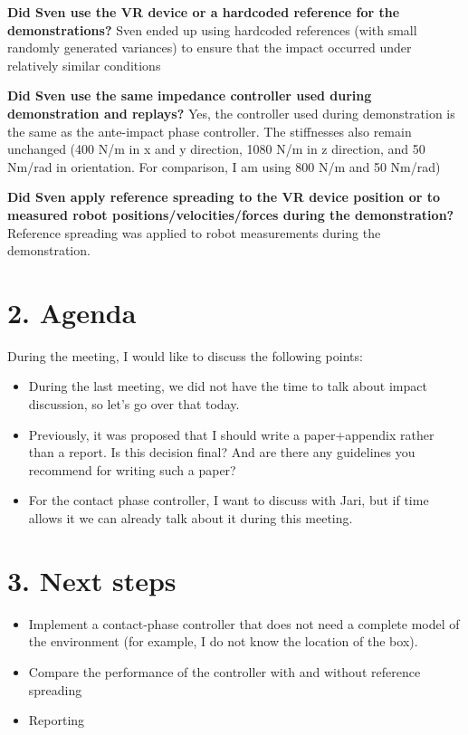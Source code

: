 \documentclass[11pt]{report}
\numberwithin{equation}{section}        %
\numberwithin{figure}{section}          %
\numberwithin{table}{section}           %
\begin{document}
\begin{itemize}
  \textbf{Did Sven use the VR device or a hardcoded reference for the demonstrations?}
  Sven ended up using hardcoded references (with small randomly generated variances) to ensure that the impact occurred under relatively similar conditions

\textbf{Did Sven use the same impedance controller used during demonstration and replays?}
  Yes, the controller used during demonstration is the same as the ante-impact phase controller. The stiffnesses also remain unchanged (400 N/m in x and y direction, 1080 N/m in z direction, and 50 Nm/rad in orientation. For comparison, I am using 800 N/m and 50 Nm/rad) 

\textbf{Did Sven apply reference spreading to the VR device position or to measured robot positions/velocities/forces during the demonstration?}
  Reference spreading was applied to robot measurements during the demonstration. 
\color{black}
  \end{itemize}

  \section*{2. Agenda}
  During the meeting, I would like to discuss the following points:

  \begin{itemize}
      \item During the last meeting, we did not have the time to talk about impact discussion, so let's go over that today.
      \item Previously, it was proposed that I should write a paper+appendix rather than a report. Is this decision final? And are there any guidelines you recommend for writing such a paper?
      \item For the contact phase controller, I want to discuss with Jari, but if time allows it we can already talk about it during this meeting.
  \end{itemize}

  \section*{3. Next steps}

  \begin{itemize}
      \item Implement a contact-phase controller that does not need a complete model of the environment (for example, I do not know the location of the box).
      \item Compare the performance of the controller with and without reference spreading
      \item Reporting
  \end{itemize}
\end{document}
